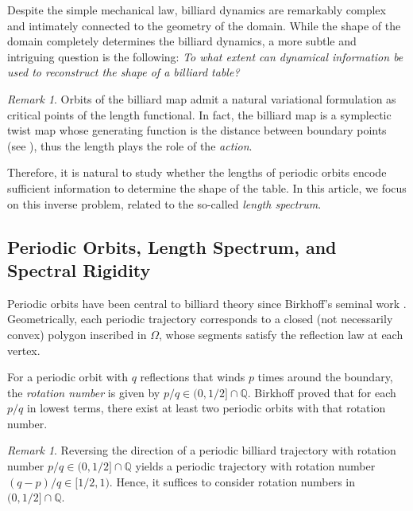 \documentclass[12pt, openany]{amsart}
\theoremstyle{definition}
\theoremstyle{remark}
\theoremstyle{remark}
\newtheorem{remark}[theorem]{Remark}
\theoremstyle{theorem}
\theoremstyle{theorem}
\theoremstyle{theorem}
\theoremstyle{theorem}
\begin{document}
Despite the simple mechanical law, billiard dynamics are remarkably complex and intimately connected to the geometry of the domain. While the shape of the domain completely determines the billiard dynamics, a more subtle and intriguing question is the following: \textit{To what extent can dynamical information be used to reconstruct the shape of a billiard table?}


\begin{remark}\label{remaction}
    Orbits of the billiard map admit a natural variational formulation as critical points of the length functional. In fact, the billiard map is a symplectic twist map whose generating function is the distance between boundary points (see \cite{Siburg, Tabach}), thus the length plays the role of the \emph{action}.
\end{remark}


Therefore, it is natural to study whether the lengths of periodic orbits encode sufficient information to determine the shape of the table. In this article, we focus on this inverse problem, related to the so-called \emph{length spectrum}.









\subsection{Periodic Orbits, Length Spectrum, and Spectral Rigidity}

Periodic orbits have been central to billiard theory since Birkhoff's seminal work \cite{Birkhoff}. Geometrically, each periodic trajectory corresponds to a closed (not necessarily convex) polygon inscribed in $\Omega$, whose segments satisfy the reflection law at each vertex.

For a periodic orbit with $q$ reflections that winds $p$ times around the boundary, the \emph{rotation number} is given by $p/q \in (0, 1/2] \cap \mathbb{Q}$. Birkhoff \cite{Birkhoff} proved that for each $p/q$ in lowest terms, there exist at least two periodic orbits with that rotation number.



\begin{remark}
    Reversing the direction of a periodic billiard trajectory with rotation number $p/q \in (0, 1/2] \cap \mathbb{Q}$ yields a periodic trajectory with rotation number $(q-p)/q \in [1/2,1)$. Hence, it suffices to consider rotation numbers in $(0, 1/2] \cap \mathbb{Q}$.
\end{remark}
\end{document}
